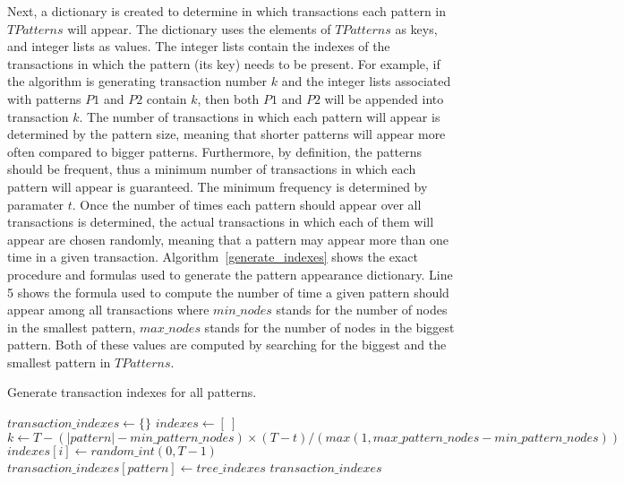 \documentclass{acm_proc_article-sp-sigmod09}
\begin{document}
Next, a dictionary is created to determine in which transactions each pattern in $TPatterns$ will appear. The dictionary uses the elements of $TPatterns$ as keys, and integer lists as values. The integer lists contain the indexes of the transactions in which the pattern (its key) needs to be present. For example, if the algorithm is generating transaction number $k$ and the integer lists associated with patterns $P1$ and $P2$ contain $k$, then both $P1$ and $P2$ will be appended into transaction $k$. The number of transactions in which each pattern will appear is determined by the pattern size, meaning that shorter patterns will appear more often compared to bigger patterns. Furthermore, by definition, the patterns should be frequent, thus a minimum number of transactions in which each pattern will appear is guaranteed. The minimum frequency is determined by paramater $t$. Once the number of times each pattern should appear over all transactions is determined, the actual transactions in which each of them will appear are chosen randomly, meaning that a pattern may appear more than one time in a given transaction. Algorithm~\ref{generate_indexes} shows the exact procedure and formulas used to generate the pattern appearance dictionary. Line 5 shows the formula used to compute the number of time a given pattern should appear among all transactions where $min\_nodes$ stands for the number of nodes in the smallest pattern, $max\_nodes$ stands for the number of nodes in the biggest pattern. Both of these values are computed by searching for the biggest and the smallest pattern in $TPatterns$.
\begin{algorithm}
\caption{Generate transaction indexes for all patterns.}
\label{generate_indexes}
\begin{algorithmic}[1]
\State $transaction\_indexes \gets \{\}$
	\State $indexes \gets [\:]$
	\State $k \gets T - (|pattern| - min\_pattern\_nodes) \times (T - t) / (max(1, max\_pattern\_nodes - min\_pattern\_nodes))$
	\State $indexes[i] \gets random\_int(0, T - 1)$
	\EndFor
	\State $transaction\_indexes[pattern] \gets tree\_indexes$
\EndFor
\Return $transaction\_indexes$
\EndFunction
\end{algorithmic}
\end{algorithm}
\end{document}
